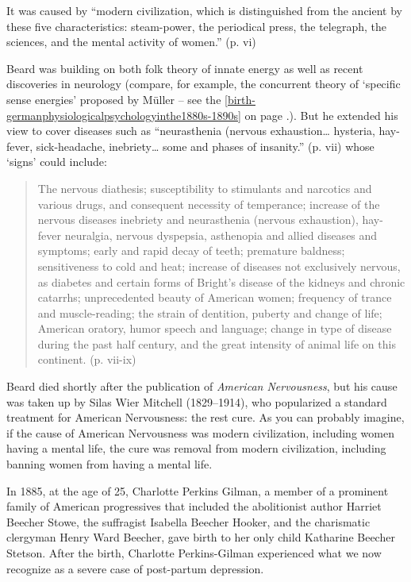 \begin{refsection}
It was caused by ``modern civilization, which is distinguished from the ancient by these five characteristics: steam-power, the periodical press, the telegraph, the sciences, and the mental activity of women.'' (p. vi)

Beard was building on both folk theory of innate energy as well as recent discoveries in neurology (compare, for example, the concurrent theory of `specific sense energies' proposed by Müller – see the \ref{birth-germanphysiologicalpsychologyinthe1880s-1890s} on page \pageref{birth-germanphysiologicalpsychologyinthe1880s-1890s}.). But he extended his view to cover diseases such as ``neurasthenia (nervous exhaustion{\ldots} hysteria, hay-fever, sick-headache, inebriety{\ldots} some and phases of insanity.'' (p. vii) whose `signs' could include:

\begin{quote}

The nervous diathesis; susceptibility to stimulants and narcotics and various drugs, and consequent necessity of temperance; increase of the nervous diseases inebriety and neurasthenia (nervous exhaustion), hay-fever neuralgia, nervous dyspepsia, asthenopia and allied diseases and symptoms; early and rapid decay of teeth; premature baldness; sensitiveness to cold and heat; increase of diseases not exclusively nervous, as diabetes and certain forms of Bright's disease of the kidneys and chronic catarrhs; unprecedented beauty of American women; frequency of trance and muscle-reading; the strain of dentition, puberty and change of life; American oratory, humor speech and language; change in type of disease during the past half century, and the great intensity of animal life on this continent. (p. vii-ix)
\end{quote}

Beard died shortly after the publication of \emph{American Nervousness}, but his cause was taken up by Silas Wier Mitchell (1829--1914), who popularized a standard treatment for American Nervousness: the rest cure. As you can probably imagine, if the cause of American Nervousness was modern civilization, including women having a mental life, the cure was removal from modern civilization, including banning women from having a mental life.

In 1885, at the age of 25, Charlotte Perkins Gilman, a member of a prominent family of American progressives that included the abolitionist author Harriet Beecher Stowe, the suffragist Isabella Beecher Hooker, and the charismatic clergyman Henry Ward Beecher, gave birth to her only child Katharine Beecher Stetson. After the birth, Charlotte Perkins-Gilman experienced what we now recognize as a severe case of post-partum depression.


\end{refsection}
